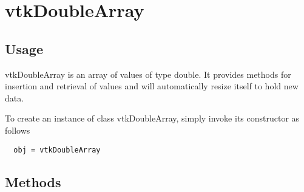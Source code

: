 \section{vtkDoubleArray}

\subsection{Usage}

 vtkDoubleArray is an array of values of type double.  It provides
 methods for insertion and retrieval of values and will
 automatically resize itself to hold new data.

To create an instance of class vtkDoubleArray, simply
invoke its constructor as follows
\begin{verbatim}
  obj = vtkDoubleArray
\end{verbatim}
\subsection{Methods}

